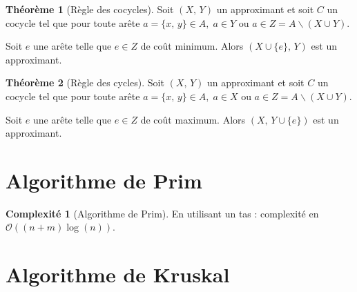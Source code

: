 \documentclass[11pt,english,french]{scrreprt}
\theoremstyle{remark}
\theoremstyle{definition}
\newtheorem*{thm*}{Théorème}
\newtheorem*{comp*}{Complexité}
\begin{document}
\begin{thm*}[Règle des cocycles]
	Soit $(X,\,Y)$ un approximant et soit $C$ un cocycle tel que pour toute arête $a=\{x,\,y\}\in A,\;a\in Y$ ou $a\in Z=A\backslash (X\cup Y)$.
	
	Soit $e$ une arête telle que $e\in Z$ de coût minimum. Alors $(X\cup\{e\},\,Y)$ est un approximant.
\end{thm*}

\begin{thm*}[Règle des cycles]
	Soit $(X,\,Y)$ un approximant et soit $C$ un cocycle tel que pour toute arête $a=\{x,\,y\}\in A,\;a\in X$ ou $a\in Z=A\backslash (X\cup Y)$.
	
	Soit $e$ une arête telle que $e\in Z$ de coût maximum. Alors $(X,\,Y\cup\{e\})$ est un approximant.
\end{thm*}

\begin{algorithm}[H]
	\DontPrintSemicolon
	\caption{Algorithme générique}
\end{algorithm}

\section{Algorithme de Prim} %

\begin{algorithm}[H]
	\DontPrintSemicolon
	\caption{Algorithme de Prim}
\end{algorithm}

\begin{comp*}[Algorithme de Prim]
	En utilisant un tas : complexité en $\mathcal{O}((n+m)\log(n))$.
\end{comp*}

\section{Algorithme de Kruskal} %
\end{document}
